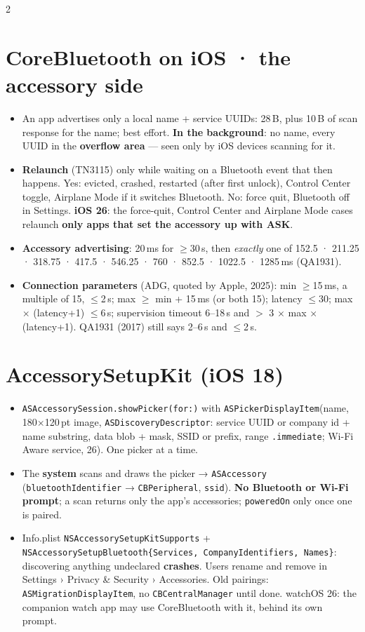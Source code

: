 \documentclass[8pt]{extarticle}
\newcommand\ct[1]{\texttt{#1}}
\begin{document}
\begin{multicols}{2}
\section{CoreBluetooth on iOS · the accessory side}
\begin{itemize}
  \item An app advertises only a local name + service UUIDs: 28\,B, plus 10\,B of scan response for
        the name; best effort. \textbf{In the background}: no name, every UUID in the
        \textbf{overflow area} — seen only by iOS devices scanning for it.
  \item \textbf{Relaunch} (TN3115) only while waiting on a Bluetooth event that then happens. Yes:
        evicted, crashed, restarted (after first unlock), Control Center toggle, Airplane Mode if it
        switches Bluetooth. No: force quit, Bluetooth off in Settings. \textbf{iOS 26}: the force-quit, Control Center and Airplane Mode
        cases relaunch \textbf{only apps that set the accessory up with ASK}.
  \item \textbf{Accessory advertising}: 20\,ms for $\ge$30\,s, then \emph{exactly} one of 152.5 ·
        211.25 · 318.75 · 417.5 · 546.25 · 760 · 852.5 · 1022.5 · 1285\,ms (QA1931).
  \item \textbf{Connection parameters} (ADG, quoted by Apple, 2025): min $\ge$15\,ms, a multiple of
        15, $\le$2\,s; max $\ge$ min + 15\,ms (or both 15); latency $\le$30; max $\times$ (latency+1)
        $\le$6\,s; supervision timeout 6–18\,s and $>$ 3 $\times$ max $\times$ (latency+1).
        QA1931 (2017) still says 2–6\,s and $\le$2\,s.
\end{itemize}

\columnbreak

\section{AccessorySetupKit (iOS 18)}
\begin{itemize}
  \item \ct{ASAccessorySession.showPicker(for:)} with \ct{ASPickerDisplayItem}(name, 180$\times$120\,pt
        image, \ct{ASDiscoveryDescriptor}: service UUID or company id + name substring, data blob +
        mask, SSID or prefix, range \ct{.immediate}; Wi-Fi Aware service, 26). One picker at a time.
  \item The \textbf{system} scans and draws the picker → \ct{ASAccessory} (\ct{bluetoothIdentifier}
        → \ct{CBPeripheral}, \ct{ssid}). \textbf{No Bluetooth or Wi-Fi prompt}; a scan returns only
        the app's accessories; \ct{poweredOn} only once one is paired.
  \item Info.plist \ct{NSAccessorySetupKitSupports} +
        \ct{NSAccessorySetupBluetooth\{Services, CompanyIdentifiers, Names\}}: discovering anything
        undeclared \textbf{crashes}. Users rename and remove in Settings › Privacy \& Security ›
        Accessories. Old pairings: \ct{ASMigrationDisplayItem}, no \ct{CBCentralManager} until done.
        watchOS 26: the companion watch app may use CoreBluetooth with it, behind its own prompt.
\end{itemize}


\end{multicols}
\end{document}
